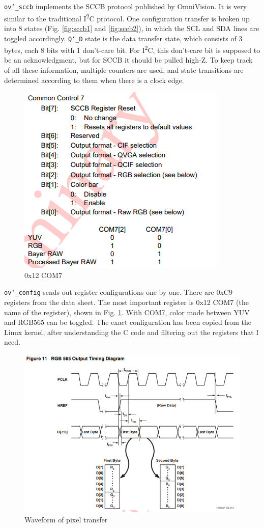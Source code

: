 \documentclass{IEEEtran}
\begin{document}
	\texttt{ov\char`_sccb} implements the SCCB protocol \cite{sccbdatasheet} published by OmniVision. It is very similar to the traditional I\textsuperscript{2}C protocol. One configuration transfer is broken up into 8 states (Fig. \ref{fig:sccb1} and \ref{fig:sccb2}), in which the SCL and SDA lines are toggled accordingly. \texttt{Q\char`_D} state is the data transfer state, which consists of 3 bytes, each 8 bits with 1 don’t-care bit. For I\textsuperscript{2}C, this don’t-care bit is supposed to be an acknowledgment, but for SCCB it should be pulled high-Z. To keep track of all these information, multiple counters are used, and state transitions are determined according to them when there is a clock edge.
	\begin{figure}[h]
		\centering
		\includegraphics[scale=0.6]{com72}
		\caption{0x12 COM7}
		\label{fig:com72}
	\end{figure}
	\texttt{ov\char`_config} sends out register configurations one by one. There are 0xC9 registers from the data sheet. The most important register is 0x12 COM7 (the name of the register), shown in Fig. \ref{fig:com72}. With COM7, color mode between YUV and RGB565 can be toggled. The exact configuration has been copied from the Linux kernel, after understanding the C code \cite{reg6} and filtering out the registers that I need.
	\begin{figure}[h]
		\centering
		\includegraphics[scale=0.5]{rgb565}
		\caption{Waveform of pixel transfer}
		\label{fig:rgb565}
	\end{figure}
\end{document}
